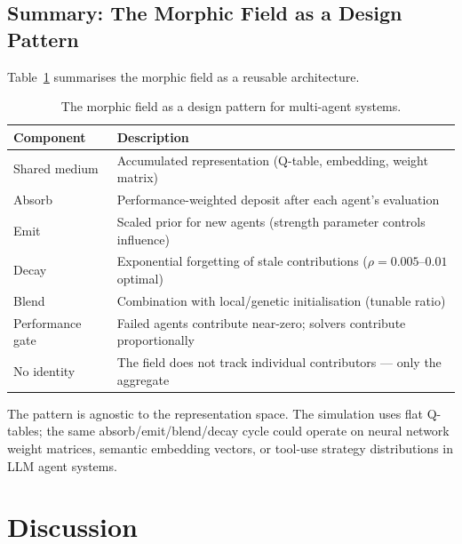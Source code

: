 \documentclass[twoside,11pt]{article}
\begin{document}
\subsection{Summary: The Morphic Field as a Design Pattern}
\label{sec:applications:summary}

Table~\ref{tab:pattern} summarises the morphic field as a reusable
architecture.

\begin{table}[ht]
\centering
\caption{The morphic field as a design pattern for multi-agent systems.}
\label{tab:pattern}
\begin{tabular}{@{}ll@{}}
\toprule
\textbf{Component} & \textbf{Description} \\
\midrule
Shared medium    & Accumulated representation (Q-table, embedding, weight
                   matrix) \\
Absorb           & Performance-weighted deposit after each agent's evaluation \\
Emit             & Scaled prior for new agents (strength parameter controls
                   influence) \\
Decay            & Exponential forgetting of stale contributions ($\rho =
                   0.005$--$0.01$ optimal) \\
Blend            & Combination with local/genetic initialisation (tunable
                   ratio) \\
Performance gate & Failed agents contribute near-zero; solvers contribute
                   proportionally \\
No identity      & The field does not track individual contributors --- only
                   the aggregate \\
\bottomrule
\end{tabular}
\end{table}

The pattern is agnostic to the representation space.  The simulation uses
flat Q-tables; the same absorb/emit/blend/decay cycle could operate on
neural network weight matrices, semantic embedding vectors, or tool-use
strategy distributions in LLM agent systems.


\section{Discussion}
\label{sec:discussion}
\end{document}
